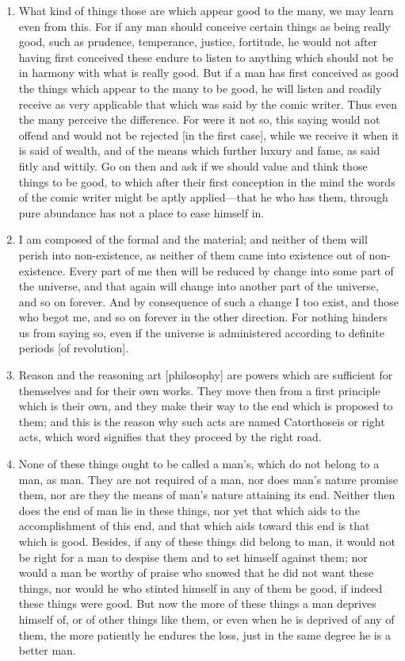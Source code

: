 \begin{enumerate}
\item What kind of things those are which appear good to the many, we may learn even from this. For if any man should conceive certain things as being really good, such as prudence, temperance, justice, fortitude, he would not after having first conceived these endure to listen to anything which should not be in harmony with what is really good. But if a man has first conceived as good the things which appear to the many to be good, he will listen and readily receive as very applicable that which was said by the comic writer. Thus even the many perceive the difference. For were it not so, this saying would not offend and would not be rejected [{\clarify in the first case}], while we receive it when it is said of wealth, and of the means which further luxury and fame, as said fitly and wittily. Go on then and ask if we should value and think those things to be good, to which after their first conception in the mind the words of the comic writer might be aptly applied—that he who has them, through pure abundance has not a place to ease himself in.

\item I am composed of the formal and the material; and neither of them will perish into non-existence, as neither of them came into existence out of non-existence. Every part of me then will be reduced by change into some part of the universe, and that again will change into another part of the universe, and so on forever. And by consequence of such a change I too exist, and those who begot me, and so on forever in the other direction. For nothing hinders us from saying so, even if the universe is administered according to definite periods [{\clarify of revolution}].

\item Reason and the reasoning art [{\clarify philosophy}] are powers which are sufficient for themselves and for their own works. They move then from a first principle which is their own, and they make their way to the end which is proposed to them; and this is the reason why such acts are named Catorthoseis or right acts, which word signifies that they proceed by the right road.

\item None of these things ought to be called a man's, which do not belong to a man, as man. They are not required of a man, nor does man's nature promise them, nor are they the means of man's nature attaining its end. Neither then does the end of man lie in these things, nor yet that which aids to the accomplishment of this end, and that which aids toward this end is that which is good. Besides, if any of these things did belong to man, it would not be right for a man to despise them and to set himself against them; nor would a man be worthy of praise who snowed that he did not want these things, nor would he who stinted himself in any of them be good, if indeed these things were good. But now the more of these things a man deprives himself of, or of other things like them, or even when he is deprived of any of them, the more patiently he endures the loss, just in the same degree he is a better man.


\end{enumerate}
